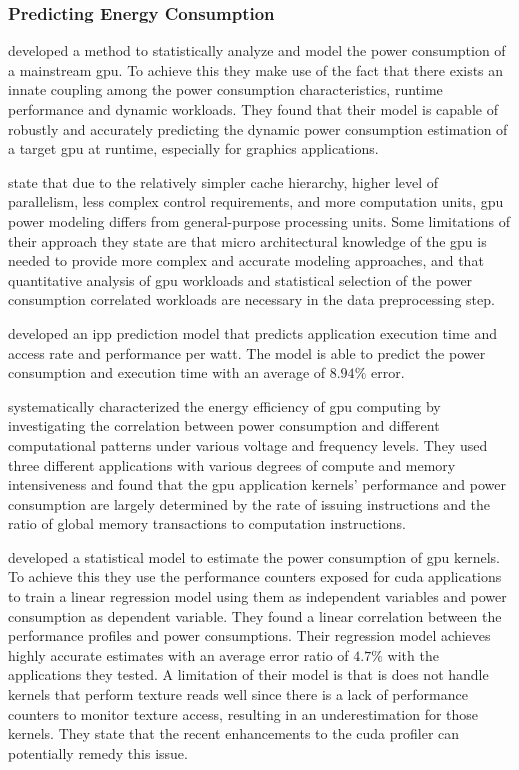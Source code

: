 			\subsubsection{Predicting Energy Consumption}
				\textcite{Ma2009} developed a method to statistically analyze and model the power consumption of a mainstream \gls{gpu}.
				To achieve this they make use of the fact that there exists an innate coupling among the power consumption characteristics, runtime performance and dynamic workloads.
				They found that their model is capable of robustly and accurately predicting the dynamic power consumption estimation of a target \gls{gpu} at runtime, especially for graphics applications.
				
				\textcite{Ma2009} state that due to the relatively simpler cache hierarchy, higher level of parallelism, less complex control requirements, and more computation units, \gls{gpu} power modeling differs from general-purpose processing units.
				Some limitations of their approach they state are that micro architectural knowledge of the \gls{gpu} is needed to provide more complex and accurate modeling approaches, and that quantitative analysis of \gls{gpu} workloads and statistical selection of the power consumption correlated workloads are necessary in the data preprocessing step.

				\textcite{Hong2010} developed an \gls{ipp} prediction model that predicts application execution time and access rate and performance per watt.
				The model is able to predict the power consumption and execution time with an average of $8.94 \%$ error.

				\textcite{Jiao2010} systematically characterized the energy efficiency of \gls{gpu} computing by investigating the correlation between power consumption and different computational patterns under various voltage and frequency levels.
				They used three different applications with various degrees of compute and memory intensiveness and found that the \gls{gpu} application kernels' performance and power consumption are largely determined by the rate of issuing instructions and the ratio of global memory transactions to computation instructions.

				\textcite{Nagasaka2010} developed a statistical model to estimate the power consumption of \gls{gpu} kernels.
				To achieve this they use the performance counters exposed for \gls{cuda} applications to train a linear regression model using them as independent variables and power consumption as dependent variable.
				They found a linear correlation between the performance profiles and power consumptions.
				Their regression model achieves highly accurate estimates with an average error ratio of $4.7 \%$ with the applications they tested.
				A limitation of their model is that is does not handle kernels that perform texture reads well since there is a lack of performance counters to monitor texture access, resulting in an underestimation for those kernels.
				They state that the recent enhancements to the \gls{cuda} profiler can potentially remedy this issue.

